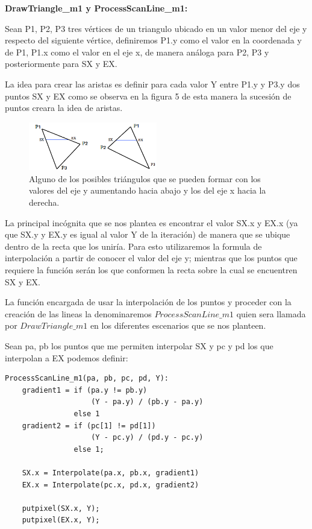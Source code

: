 \documentclass[a4paper]{article}
\begin{document}
\textbf{DrawTriangle\_m1 y ProcessScanLine\_m1:}
\par Sean  P1, P2, P3 tres vértices de un triangulo ubicado en un valor menor del eje y respecto del siguiente vértice, definiremos P1.y como el valor en la coordenada y de P1, P1.x como el valor en el eje x, de manera análoga para P2, P3 y posteriormente para SX y EX. 
\par La idea para crear las aristas es definir para cada valor Y entre P1.y y P3.y dos puntos SX y EX como se observa en la figura 5 de esta manera la sucesión de puntos creara la idea de aristas.
\begin{figure}[h]
    \centering
    \includegraphics[width=0.50\textwidth]{Imagenes/e.png}
    \caption{Alguno de los posibles triángulos que se pueden formar con los valores del eje y aumentando hacia abajo y los del eje x hacia la derecha.}
    \label{fig:mesh1}
\end{figure}
\par La principal incógnita que se nos plantea es encontrar el valor SX.x y EX.x (ya que SX.y y EX.y es igual al valor Y de la iteración) de manera que se ubique dentro de la recta que los uniría. Para esto utilizaremos la formula de interpolación a partir de conocer el valor del eje y; mientras que los puntos que requiere la función serán los que conformen la recta sobre la cual se encuentren SX y EX.
\par La función encargada de usar la interpolación de los puntos y proceder con la creación de las lineas la denominaremos $ProcessScanLine\_m1$ quien sera llamada por $DrawTriangle\_m1$ en los diferentes escenarios que se nos planteen. 
\par Sean pa, pb los puntos que me permiten interpolar SX y pc y pd los que interpolan a EX podemos definir: 
\begin{verbatim}
ProcessScanLine_m1(pa, pb, pc, pd, Y):
    gradient1 = if (pa.y != pb.y) 
                    (Y - pa.y) / (pb.y - pa.y)
                else 1                          
    gradient2 = if (pc[1] != pd[1]) 
                    (Y - pc.y) / (pd.y - pc.y)
                else 1;
            
    SX.x = Interpolate(pa.x, pb.x, gradient1)
    EX.x = Interpolate(pc.x, pd.x, gradient2)
    
    putpixel(SX.x, Y);
    putpixel(EX.x, Y);
\end{verbatim}
\end{document}
